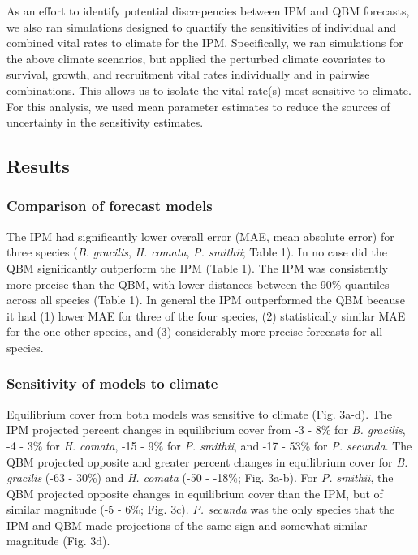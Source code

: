 \documentclass[12pt,]{article}
\begin{document}
As an effort to identify potential discrepencies between IPM and QBM
forecasts, we also ran simulations designed to quantify the
sensitivities of individual and combined vital rates to climate for the
IPM. Specifically, we ran simulations for the above climate scenarios,
but applied the perturbed climate covariates to survival, growth, and
recruitment vital rates individually and in pairwise combinations. This
allows us to isolate the vital rate(s) most sensitive to climate. For
this analysis, we used mean parameter estimates to reduce the sources of
uncertainty in the sensitivity estimates.

\subsection{Results}\label{results}

\subsubsection{Comparison of forecast
models}\label{comparison-of-forecast-models}

The IPM had significantly lower overall error (MAE, mean absolute error)
for three species (\emph{B. gracilis}, \emph{H. comata}, \emph{P.
smithii}; Table 1). In no case did the QBM significantly outperform the
IPM (Table 1). The IPM was consistently more precise than the QBM, with
lower distances between the 90\% quantiles across all species (Table 1).
In general the IPM outperformed the QBM because it had (1) lower MAE for
three of the four species, (2) statistically similar MAE for the one
other species, and (3) considerably more precise forecasts for all
species.

\subsubsection{Sensitivity of models to
climate}\label{sensitivity-of-models-to-climate}

Equilibrium cover from both models was sensitive to climate (Fig. 3a-d).
The IPM projected percent changes in equilibrium cover from -3 - 8\% for
\emph{B. gracilis}, -4 - 3\% for \emph{H. comata}, -15 - 9\% for
\emph{P. smithii}, and -17 - 53\% for \emph{P. secunda}. The QBM
projected opposite and greater percent changes in equilibrium cover for
\emph{B. gracilis} (-63 - 30\%) and \emph{H. comata} (-50 - -18\%; Fig.
3a-b). For \emph{P. smithii}, the QBM projected opposite changes in
equilibrium cover than the IPM, but of similar magnitude (-5 - 6\%; Fig.
3c). \emph{P. secunda} was the only species that the IPM and QBM made
projections of the same sign and somewhat similar magnitude (Fig. 3d).
\end{document}
